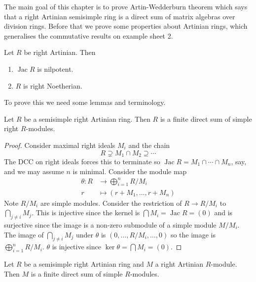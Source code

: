 \documentclass[a4paper]{article}
\DeclareMathOperator{\jac}{Jac} %
\begin{document}
The main goal of this chapter is to prove Artin-Wedderburn theorem which says that a right Artinian semisimple ring is a direct sum of matrix algebras over division rings. Before that we prove some properties about Artinian rings, which generalises the commutative results on example sheet 2.

\begin{theorem}
  \label{thm:properties of Artinian rings}
  Let \(R\) be right Artinian. Then
  \begin{enumerate}
  \item \(\jac R\) is nilpotent.
  \item \(R\) is right Noetherian.
  \end{enumerate}
\end{theorem}

To prove this we need some lemmas and terminology.

\begin{lemma}
  Let \(R\) be a semisimple right Artinian ring. Then \(R\) is a finite direct sum of simple right \(R\)-modules.
\end{lemma}

\begin{proof}
  Consider maximal right ideals \(M_i\) and the chain
  \[
    R \supsetneq M_1 \cap M_2 \supseteq \cdots
  \]
  The DCC on right ideals forces this to terminate so \(\jac R = M_1 \cap \cdots \cap M_n\), say, and we may assume \(n\) is minimal. Consider the module map
  \begin{align*}
    \theta: R &\to \bigoplus_{i = 1}^n R/M_i \\
    r &\mapsto (r + M_1, \dots, r + M_n)
  \end{align*}
  Note \(R/M_i\) are simple modules. Consider the restriction of \(R \to R/M_i\) to \(\bigcap_{j \ne i} M_j\). This is injective since the kernel is \(\bigcap M_i = \jac R = (0)\) and is surjective since the image is a non-zero submodule of a simple module \(M/M_i\). The image of \(\bigcap_{j \neq i} M_j\) under \(\theta\) is \((0, \dots, R/M_i, \dots, 0)\) so the image is \(\bigoplus_{i = 1}^n R/M_i\). \(\theta\) is injective since \(\ker \theta = \bigcap M_i = (0)\).
\end{proof}

\begin{lemma}
  Let \(R\) be a semisimple right Artinian ring and \(M\) a right Artinian \(R\)-module. Then \(M\) is a finite direct sum of simple \(R\)-modules.
\end{lemma}
\end{document}
